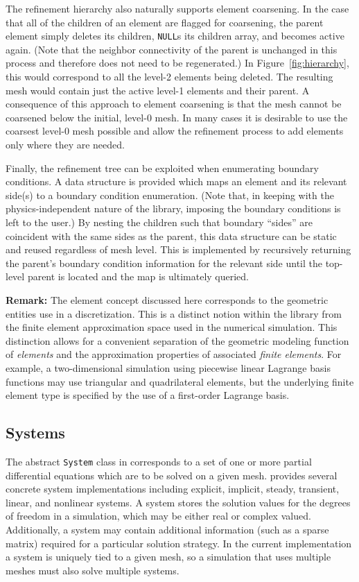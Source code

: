 The refinement hierarchy also naturally supports element
coarsening. In the case that all of the children of an element are
flagged for coarsening, the parent element simply deletes its
children, \texttt{NULL}s its children array, and becomes active again.
(Note that the neighbor connectivity of the parent is unchanged in
this process and therefore does not need to be regenerated.)  In
Figure~\ref{fig:hierarchy}, this would correspond to all the level-2
elements being deleted.  The resulting mesh would contain just the
active level-1 elements and their parent.  A consequence of this
approach to element coarsening is that the mesh cannot be coarsened
below the initial, level-0 mesh.  In many cases it is desirable to use
the coarsest level-0 mesh possible and allow the refinement process to
add elements only where they are needed.

Finally, the refinement tree can be exploited when enumerating
boundary conditions.  A data structure is provided which maps an
element and its relevant side(s) to a boundary condition
enumeration. (Note that, in keeping with the physics-independent
nature of the library, imposing the boundary conditions is left to the
user.)  By nesting the children such that boundary ``sides'' are
coincident with the same sides as the parent, this data structure can
be static and reused regardless of mesh level. This is implemented by
recursively returning the parent's boundary condition information for
the relevant side until the top-level parent is located and the map is
ultimately queried.

\textbf{Remark:} The element concept discussed here corresponds to the
geometric entities use in a discretization.  This is a distinct notion
within the library from the finite element approximation space used in
the numerical simulation.  This distinction allows for a convenient
separation of the geometric modeling function of \emph{elements} and
the approximation properties of associated \emph{finite elements}.
For example, a two-dimensional simulation using piecewise linear
Lagrange basis functions may use triangular and quadrilateral
elements, but the underlying finite element type is specified by the
use of a first-order Lagrange basis.

\subsection{Systems}
The abstract \texttt{System} class in \libMesh{} corresponds to a set
of one or more partial differential equations which are to be solved
on a given mesh.  \libMesh{} provides several concrete system
implementations including explicit, implicit, steady, transient,
linear, and nonlinear systems.  A system stores the solution values
for the degrees of freedom in a simulation, which may be either real
or complex valued.  Additionally, a system may contain additional
information (such as a sparse matrix) required for a particular
solution strategy.  In the current implementation a system is uniquely
tied to a given mesh, so a simulation that uses multiple meshes must
also solve multiple systems.

